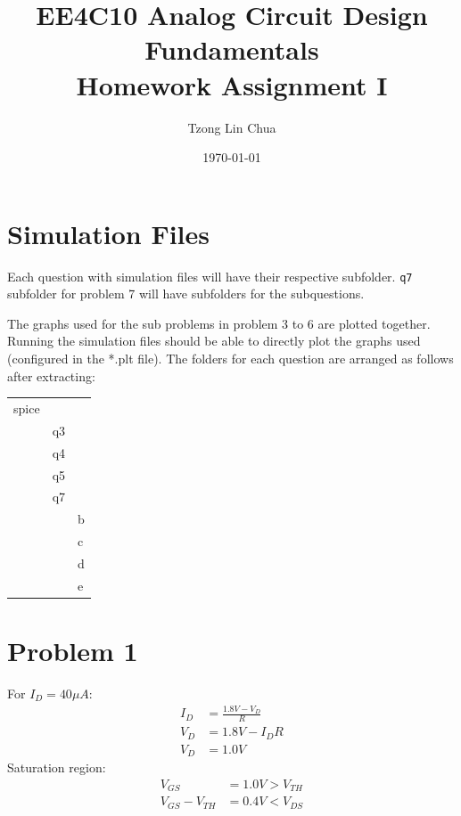 \documentclass{article}
\author{Tzong Lin Chua}
\date{\today}
\title{EE4C10 Analog Circuit Design Fundamentals\\\medskip
\large Homework Assignment I }
\begin{document}
\maketitle
\tableofcontents


\section{Simulation Files}
\label{sec:orga03d1af}
Each question with simulation files will have their respective subfolder.
\texttt{q7} subfolder for problem 7 will have subfolders for the subquestions.

The graphs used for the sub problems in problem 3 to 6 are plotted together.
Running the simulation files should be able to directly plot the graphs used (configured in the *.plt file).
The folders for each question are arranged as follows after extracting:

\begin{center}
\begin{tabular}{lll}
\hline
spice &  & \\
 & q3 & \\
 & q4 & \\
 & q5 & \\
 & q7 & \\
 &  & b\\
 &  & c\\
 &  & d\\
 &  & e\\
\hline
\end{tabular}
\end{center}
\section{Problem 1}
\label{sec:org2d92f33}
For \(I_{D} = 40 \mu{}A\):
\begin{equation*}
\begin{aligned}
I_{D} &= \frac{1.8V - V_{D}}{R} \\
V_{D} &= 1.8V - I_{D}R \\
V_{D} &= 1.0V
\end{aligned}
\end{equation*}
Saturation region:
\begin{equation*}
\begin{aligned}
V_{GS} &= 1.0V > V_{TH} \\
V_{GS} - V_{TH}&= 0.4V < V_{DS} \\
\end{aligned}
\end{equation*}
\end{document}
